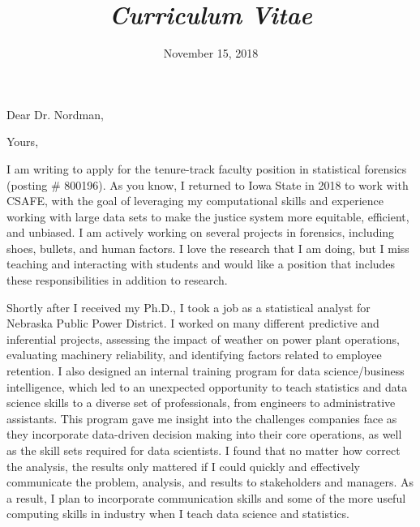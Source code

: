 \documentclass[12pt, letterpaper, sans]{moderncv}
\title{\emph{Curriculum Vitae}}
\begin{document}
\date{November 15, 2018}
\opening{Dear Dr. Nordman,}
\closing{Yours,}
\makelettertitle

I am writing to apply for the tenure-track faculty position in statistical forensics (posting \# 800196). As you know, I returned to Iowa State in 2018 to work with CSAFE, with the goal of leveraging my computational skills and experience working with large data sets to make the justice system more equitable, efficient, and unbiased. I am actively working on several projects in forensics, including shoes, bullets, and human factors. I love the research that I am doing, but I miss teaching and interacting with students and would like a position that includes these responsibilities in addition to research. 

Shortly after I received my Ph.D., I took a job as a statistical analyst for Nebraska Public Power District. I worked on many different predictive and inferential projects, assessing the impact of weather on power plant operations, evaluating machinery reliability, and identifying factors related to employee retention. I also designed an internal training program for data science/business intelligence, which led to an unexpected opportunity to teach statistics and data science skills to a diverse set of professionals, from engineers to administrative assistants. This program gave me insight into the challenges companies face as they incorporate data-driven decision making into their core operations, as well as the skill sets required for data scientists. I found that no matter how correct the analysis, the results only mattered if I could quickly and effectively communicate the problem, analysis, and results to stakeholders and managers. As a result, I plan to incorporate communication skills and some of the more useful computing skills in industry when I teach data science and statistics. 
\end{document}
